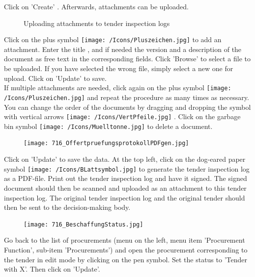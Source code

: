 \vspace{\baselineskip}

Click on 'Create' . Afterwards, attachments can be uploaded.

\begin{figure}[H]
\caption{Uploading attachments to tender inspection logs}
\end{figure}

Click on the plus symbol \texttt{[image: /Icons/Pluszeichen.jpg]}  to add an attachment. Enter the title , and if needed the version  and a description of the document  as free text in the corresponding fields. Click 'Browse'  to select a file to be uploaded. If you have selected the wrong file, simply select a new one for upload. Click on 'Update' to save. \\
If multiple attachments are needed, click again on the plus symbol \texttt{[image: /Icons/Pluszeichen.jpg]}  and repeat the procedure as many times as necessary. You can change the order of the documents by dragging and dropping the symbol with vertical arrows \texttt{[image: /Icons/VertPfeile.jpg]} . Click on the garbage bin symbol \texttt{[image: /Icons/Muelltonne.jpg]}  to delete a document.

\vspace{\baselineskip}

\begin{figure}
\vspace{-15pt}
\texttt{[image: 716\_OffertpruefungsprotokollPDFgen.jpg]}
\end{figure}
Click on 'Update'  to save the data. At the top left, 
click on the dog-eared paper symbol \texttt{[image: /Icons/BLattsymbol.jpg]} to generate the tender inspection log as a PDF-file. Print out the tender inspection log and have it signed. The signed document should then be scanned and uploaded as an attachment to this tender inspection log. 
The original tender inspection log and the original tender should then be sent to the decision-making body.

\vspace{\baselineskip}

\begin{figure}
\vspace{-15pt}
\texttt{[image: 716\_BeschaffungStatus.jpg]}
\end{figure}
Go back to the list of procurements (menu on the left, menu item 'Procurement Function', sub-item 'Procurements') 
and open the procurement corresponding to the tender in edit mode by clicking on the pen symbol. Set the status to 'Tender with X'. Then click on 'Update'.

